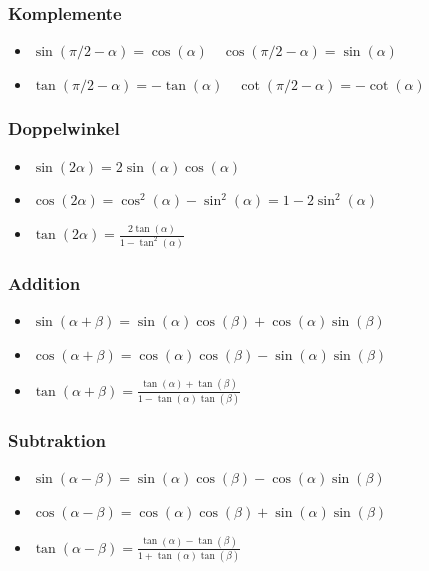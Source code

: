 \documentclass[8pt]{extarticle}
\begin{document}
\begin{multicols*}{3}
\subsubsection{Komplemente}
\begin{itemize}
 \item $\sin(\pi/2 - \alpha) = \cos(\alpha) \quad \cos(\pi/2 - \alpha) = \sin(\alpha)$
 \item $\tan(\pi/2 - \alpha) = -\tan(\alpha) \quad \cot(\pi/2 - \alpha) = -\cot(\alpha)$
\end{itemize}

\subsubsection{Doppelwinkel}
\begin{itemize}
 \item $\sin(2\alpha) = 2 \sin(\alpha) \cos(\alpha)$
 \item $\cos(2\alpha) = \cos^2(\alpha) - \sin^2(\alpha) = 1 - 2 \sin^2(\alpha)$
 \item $\tan(2\alpha) = \frac{2\tan(\alpha)}{1 - \tan^2(\alpha)}$
\end{itemize}

\subsubsection{Addition}
\begin{itemize}
 \item $\sin(\alpha + \beta) = \sin(\alpha) \cos(\beta) + \cos(\alpha) \sin(\beta)$
 \item $\cos(\alpha + \beta) = \cos(\alpha) \cos(\beta) - \sin(\alpha) \sin(\beta)$
 \item $\tan(\alpha + \beta) = \frac{\tan(\alpha) + \tan(\beta)}{1 - \tan(\alpha) \tan(\beta)}$
\end{itemize}

\subsubsection{Subtraktion}
\begin{itemize}
 \item $\sin(\alpha - \beta) = \sin(\alpha) \cos(\beta) - \cos(\alpha)\sin(\beta)$
 \item $\cos(\alpha - \beta) = \cos(\alpha) \cos(\beta) + \sin(\alpha)\sin(\beta)$
 \item $\tan(\alpha - \beta) = \frac{\tan(\alpha) - \tan(\beta)}{1+\tan(\alpha) \tan(\beta)}$
\end{itemize}


\end{multicols*}
\end{document}
